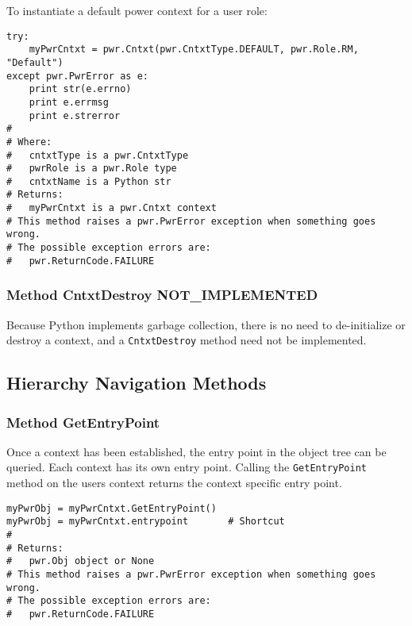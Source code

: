 \documentclass[12pt]{report} %
\begin{document}
\begin{appendices}
To instantiate a default power context for a user role:

\begin{center}\begin{minipage}{.95\linewidth}\begin{lstlisting}
try:
    myPwrCntxt = pwr.Cntxt(pwr.CntxtType.DEFAULT, pwr.Role.RM, "Default")
except pwr.PwrError as e:
    print str(e.errno)
    print e.errmsg
    print e.strerror
#
# Where:
#   cntxtType is a pwr.CntxtType
#   pwrRole is a pwr.Role type
#   cntxtName is a Python str
# Returns:
#   myPwrCntxt is a pwr.Cntxt context
# This method raises a pwr.PwrError exception when something goes wrong.
# The possible exception errors are:
#   pwr.ReturnCode.FAILURE
\end{lstlisting}\end{minipage}\end{center}

\subsubsection{Method CntxtDestroy NOT_IMPLEMENTED} \label{meth:CntxtDestroy}

Because Python implements garbage collection, there is no need to de-initialize or
destroy a context, and a \texttt{CntxtDestroy} method need not be implemented.

\subsection{Hierarchy Navigation Methods}
\label{sec:PythonHierarchyNavigationMethods}

\subsubsection{Method GetEntryPoint} \label{meth:GetEntryPoint}

Once a context has been established, the entry point in the object tree can
be queried. Each context has its own entry point. Calling the
\texttt{GetEntryPoint} method on the users context returns the context specific
entry point.

\begin{center}\begin{minipage}{.95\linewidth}\begin{lstlisting}
myPwrObj = myPwrCntxt.GetEntryPoint()
myPwrObj = myPwrCntxt.entrypoint       # Shortcut
#
# Returns:
#   pwr.Obj object or None
# This method raises a pwr.PwrError exception when something goes wrong.
# The possible exception errors are:
#   pwr.ReturnCode.FAILURE
\end{lstlisting}\end{minipage}\end{center}


\end{appendices}
\end{document}
